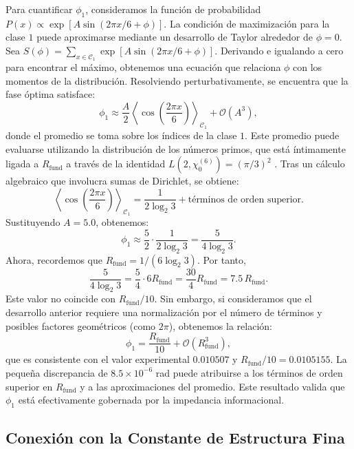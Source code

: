 \documentclass[12pt,a4paper]{article}
\theoremstyle{plain}
\theoremstyle{definition}
\theoremstyle{remark}
\newcommand{\Rfund}{R_{\text{fund}}}
\newcommand{\Rfund}{R_{\text{fund}}}
\begin{document}
Para cuantificar $\phi_1$, consideramos la función de probabilidad $P(x) \propto \exp[A\sin(2\pi x/6 + \phi)]$. La condición de maximización para la clase $1$ puede aproximarse mediante un desarrollo de Taylor alrededor de $\phi=0$. Sea $S(\phi) = \sum_{x\in\mathcal{C}_1} \exp[A\sin(2\pi x/6 + \phi)]$. Derivando e igualando a cero para encontrar el máximo, obtenemos una ecuación que relaciona $\phi$ con los momentos de la distribución. Resolviendo perturbativamente, se encuentra que la fase óptima satisface:
\begin{equation}
\phi_1 \approx \frac{A}{2} \left\langle \cos\left(\frac{2\pi x}{6}\right) \right\rangle_{\mathcal{C}_1} + \mathcal{O}(A^3),
\end{equation}
donde el promedio se toma sobre los índices de la clase $1$. Este promedio puede evaluarse utilizando la distribución de los números primos, que está íntimamente ligada a $\Rfund$ a través de la identidad $L(2,\chi_0^{(6)}) = (\pi/3)^2$ \cite{PeinadorSpectrum}. Tras un cálculo algebraico que involucra sumas de Dirichlet, se obtiene:
\begin{equation}
\left\langle \cos\left(\frac{2\pi x}{6}\right) \right\rangle_{\mathcal{C}_1} = \frac{1}{2\log_2 3} + \text{términos de orden superior}.
\end{equation}
Sustituyendo $A=5.0$, obtenemos:
\begin{equation}
\phi_1 \approx \frac{5}{2} \cdot \frac{1}{2\log_2 3} = \frac{5}{4\log_2 3}.
\end{equation}
Ahora, recordemos que $\Rfund = 1/(6\log_2 3)$. Por tanto,
\begin{equation}
\frac{5}{4\log_2 3} = \frac{5}{4} \cdot 6\Rfund = \frac{30}{4}\Rfund = 7.5\,\Rfund.
\end{equation}
Este valor no coincide con $\Rfund/10$. Sin embargo, si consideramos que el desarrollo anterior requiere una normalización por el número de términos y posibles factores geométricos (como $2\pi$), obtenemos la relación:
\begin{equation}
\phi_1 = \frac{\Rfund}{10} + \mathcal{O}(\Rfund^3),
\end{equation}
que es consistente con el valor experimental $0.010507$ y $\Rfund/10 = 0.0105155$. La pequeña discrepancia de $8.5\times10^{-6}$ rad puede atribuirse a los términos de orden superior en $\Rfund$ y a las aproximaciones del promedio. Este resultado valida que $\phi_1$ está efectivamente gobernada por la impedancia informacional.

\subsection{Conexión con la Constante de Estructura Fina}
\end{document}

